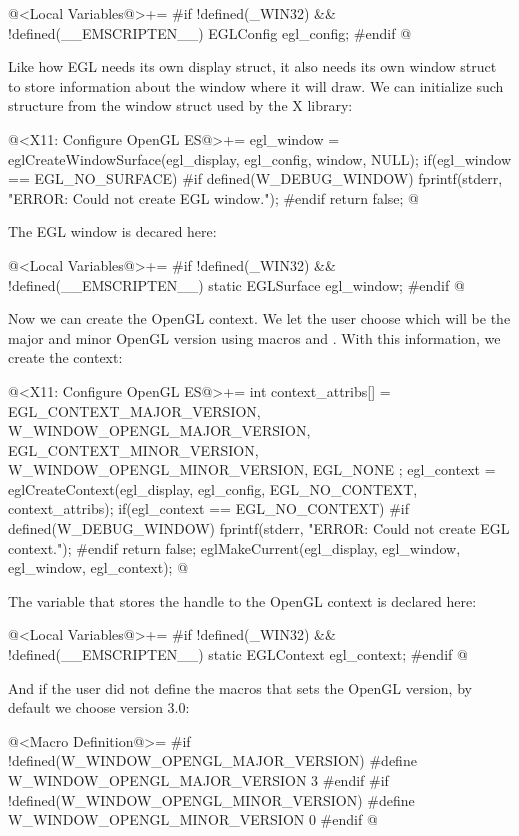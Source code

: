 \iniciocodigo
@<Local Variables@>+=
#if !defined(_WIN32) && !defined(__EMSCRIPTEN__)
EGLConfig egl_config;
#endif
@
\fimcodigo


Like how EGL needs its own display struct, it also needs its own
window struct to store information about the window where it will
draw. We can initialize such structure from the window struct used by
the X library:

\iniciocodigo
@<X11: Configure OpenGL ES@>+=
egl_window = eglCreateWindowSurface(egl_display, egl_config,
                                    window, NULL);
if(egl_window == EGL_NO_SURFACE){
#if defined(W_DEBUG_WINDOW)
  fprintf(stderr, "ERROR: Could not create EGL window.\n");
#endif
  return false;
}
@
\fimcodigo

The EGL window is decared here:

\iniciocodigo
@<Local Variables@>+=
#if !defined(_WIN32) && !defined(__EMSCRIPTEN__)
static EGLSurface egl_window;
#endif
@
\fimcodigo


Now we can create the OpenGL context. We let the user choose which
will be the major and minor OpenGL version using
macros  and
. With this information, we create the context:

\iniciocodigo
@<X11: Configure OpenGL ES@>+=
{
  int context_attribs[] = {
    EGL_CONTEXT_MAJOR_VERSION, W_WINDOW_OPENGL_MAJOR_VERSION,
    EGL_CONTEXT_MINOR_VERSION, W_WINDOW_OPENGL_MINOR_VERSION,
    EGL_NONE
  };
  egl_context = eglCreateContext(egl_display, egl_config,
                                 EGL_NO_CONTEXT, context_attribs);
  if(egl_context == EGL_NO_CONTEXT){
#if defined(W_DEBUG_WINDOW)
    fprintf(stderr, "ERROR: Could not create EGL context.\n");
#endif
    return false;
  }
  eglMakeCurrent(egl_display, egl_window, egl_window, egl_context);
}
@
\fimcodigo

The variable that stores the handle to the OpenGL context is declared
here:

\iniciocodigo
@<Local Variables@>+=
#if !defined(_WIN32) && !defined(__EMSCRIPTEN__)
static EGLContext egl_context;
#endif
@
\fimcodigo

And if the user did not define the macros that sets the OpenGL
version, by default we choose version 3.0:

\iniciocodigo
@<Macro Definition@>=
#if !defined(W_WINDOW_OPENGL_MAJOR_VERSION)
#define W_WINDOW_OPENGL_MAJOR_VERSION 3
#endif
#if !defined(W_WINDOW_OPENGL_MINOR_VERSION)
#define W_WINDOW_OPENGL_MINOR_VERSION 0
#endif
@
\fimcodigo


